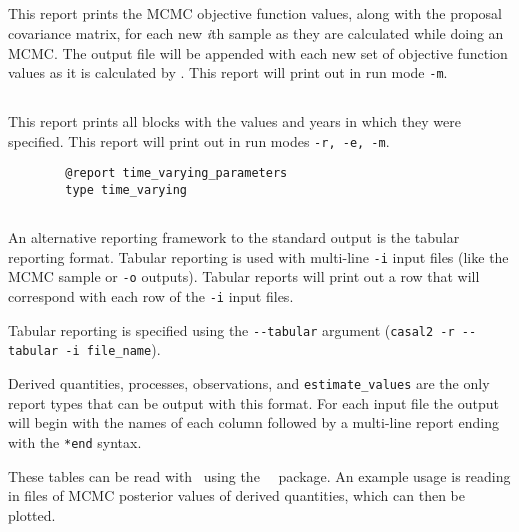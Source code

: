 \subsection{}\label{sec:Report-MCMCObjective}

This report prints the MCMC objective function values, along with the proposal covariance matrix, for each new \textit{i}th sample as they are calculated while doing an MCMC. The output file will be appended with each new set of objective function values as it is calculated by \CNAME. This report will print out in run mode \texttt{-m}.

\subsection{}\label{sec:Report-TimeVarying}

This report prints all  blocks with the values and years in which they were specified. This report will print out in run modes \texttt{-r, -e, -m}.

{\small{\begin{verbatim}
		@report time_varying_parameters
		type time_varying
		\end{verbatim}}}

\subsection{}\label{sec:Tabular}

An alternative reporting framework to the standard output is the tabular reporting format. Tabular reporting is used with multi-line \texttt{-i} input files (like the MCMC sample or \texttt{-o} outputs). Tabular reports will print out a row that will correspond with each row of the \texttt{-i} input files.

Tabular reporting is specified using the \texttt{-{}-tabular} argument (\texttt{casal2 -r -{}-tabular -i file\_name}).

Derived quantities, processes, observations, and \texttt{estimate\_values} are the only report types that can be output with this format. For each input file the output will begin with the names of each column followed by a multi-line report ending with the \texttt{*end} syntax.

These tables can be read with \R\ using the \CNAME\ \R\ package. An example usage is reading in files of MCMC posterior values of derived quantities, which can then be plotted.


